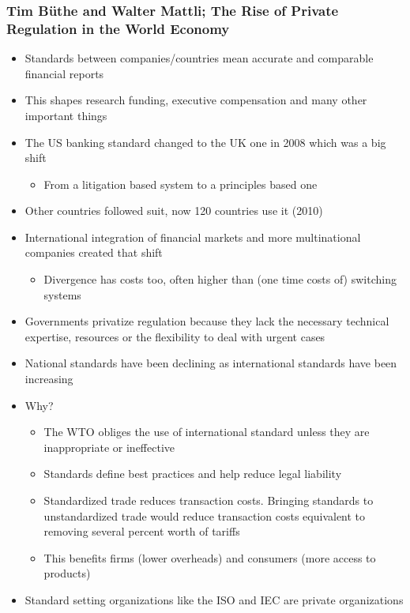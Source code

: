 \documentclass[11pt]{article}
\begin{document}
\subsubsection{Tim Büthe and Walter Mattli; The Rise of Private Regulation in the World Economy}
\label{sec:orgcbc1cb1}
\begin{itemize}
\item Standards between companies/countries mean accurate and comparable financial reports
\item This shapes research funding, executive compensation and many other important things
\item The US banking standard changed to the UK one in 2008 which was a big shift
\begin{itemize}
\item From a litigation based system to a principles based one
\end{itemize}
\item Other countries followed suit, now 120 countries use it (2010)
\item International integration of financial markets and more multinational
companies created that shift
\begin{itemize}
\item Divergence has costs too, often higher than (one time costs of) switching systems
\end{itemize}
\item Governments privatize regulation because they lack the necessary technical
expertise, resources or the flexibility to deal with urgent cases
\item National standards have been declining as international standards have been increasing
\item Why?
\begin{itemize}
\item The WTO obliges the use of international standard unless they are
inappropriate or ineffective
\item Standards define best practices and help reduce legal liability
\item Standardized trade reduces transaction costs. Bringing standards to
unstandardized trade would reduce transaction costs equivalent to removing
several percent worth of tariffs
\item This benefits firms (lower overheads) and consumers (more access to products)
\end{itemize}
\item Standard setting organizations like the ISO and IEC are private organizations

\end{itemize}
\end{document}
